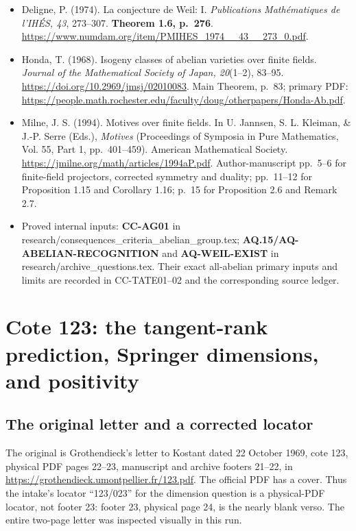 \documentclass[11pt,a4paper]{article}
\providecommand{\tightlist}{\setlength{\itemsep}{0pt}\setlength{\parskip}{0pt}}
\theoremstyle{definition}\newtheorem{definition}[theorem]{Definition}
\theoremstyle{remark}\newtheorem{remark}[theorem]{Remark}
\begin{document}
\begin{itemize}
\tightlist
\item
  Deligne, P. (1974). La conjecture de Weil: I. \emph{Publications
  Mathématiques de l'IHÉS, 43}, 273--307. \textbf{Theorem 1.6, p.~276}.
  \url{https://www.numdam.org/item/PMIHES\_1974\_\_43\_\_273\_0.pdf}.
\item
  Honda, T. (1968). Isogeny classes of abelian varieties over finite
  fields. \emph{Journal of the Mathematical Society of Japan, 20}(1--2),
  83--95. \url{https://doi.org/10.2969/jmsj/02010083}. Main Theorem, p.~83;
  primary PDF:
  \url{https://people.math.rochester.edu/faculty/doug/otherpapers/Honda-Ab.pdf}.
\item
  Milne, J. S. (1994). Motives over finite fields. In U. Jannsen, S. L.
  Kleiman, \& J.-P. Serre (Eds.), \emph{Motives} (Proceedings of
  Symposia in Pure Mathematics, Vol. 55, Part 1, pp.~401--459). American
  Mathematical Society. \url{https://jmilne.org/math/articles/1994aP.pdf}.
  Author-manuscript pp.~5--6 for finite-field projectors, corrected
  symmetry and duality; pp.~11--12 for Proposition 1.15 and Corollary
  1.16; p.~15 for Proposition 2.6 and Remark 2.7.
\item
  Proved internal inputs: \textbf{CC-AG01} in
  research/consequences\_criteria\_abelian\_group.tex;
  \textbf{AQ.15/AQ-ABELIAN-RECOGNITION} and \textbf{AQ-WEIL-EXIST} in
  research/archive\_questions.tex. Their exact all-abelian primary
  inputs and limits are recorded in CC-TATE01--02 and the corresponding
  source ledger.
\end{itemize}


\section{Cote 123: the tangent-rank prediction, Springer dimensions, and positivity}
\label{sec:cote123}

\subsection{The original letter and a corrected locator}
The original is Grothendieck's letter to Kostant dated 22 October 1969,
cote 123, physical PDF pages 22--23, manuscript and archive footers
21--22, in \url{https://grothendieck.umontpellier.fr/123.pdf}.
The official PDF has a cover. Thus the intake's locator ``123/023''
for the dimension question is a physical-PDF locator, not footer 23:
footer 23, physical page 24, is the nearly blank verso.
The entire two-page letter was inspected visually in this run.
\end{document}
